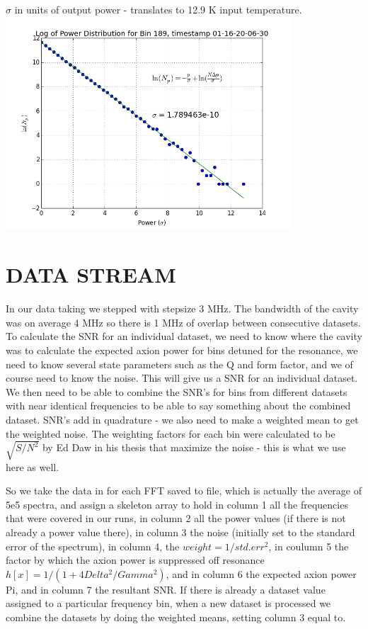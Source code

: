 \documentclass[11pt]{article}
\begin{document}
$\sigma$ in units of output power - translates to 12.9 K input temperature.
\includegraphics[width=0.8\textwidth]{logexpdistribution189}

\section{DATA STREAM}

In our data taking we stepped with stepsize 3 MHz. The bandwidth of the cavity was on average 4 MHz so there is 1 MHz of overlap between consecutive datasets. To calculate the SNR for an individual dataset, we need to know where the cavity was to calculate the expected axion power for bins detuned for the resonance, we need to know several state parameters such as the Q and form factor, and we of course need to know the noise. This will give us a SNR for an individual dataset. We then need to be able to combine the SNR’s for bins from different datasets with near identical frequencies to be able to say something about the combined dataset. SNR’s add in quadrature - we also need to make a weighted mean to get the weighted noise. The weighting factors for each bin were calculated to be $\sqrt{S/N^2}$ by Ed Daw in his thesis that maximize the noise - this is what we use here as well.

So we take the data in for each FFT saved to file, which is actually the average of 5e5 spectra, and assign a skeleton array to hold in column 1 all the frequencies that were covered in our runs, in column 2 all the power values (if there is not already a power value there), in column 3 the noise (initially set to the standard error of the spectrum), in column 4, the $weight=1/std.err^2$, in coulumn 5 the factor by which the axion power is suppressed off resonance $h[x] = 1/(1+4Delta^2/Gamma^2)$, and in column 6 the expected axion power Pi, and in column 7 the resultant SNR. If there is already a dataset value assigned to a particular frequency bin, when a new dataset is processed we combine the datasets by doing the weighted means, setting column 3 equal to.
%
\end{document}
